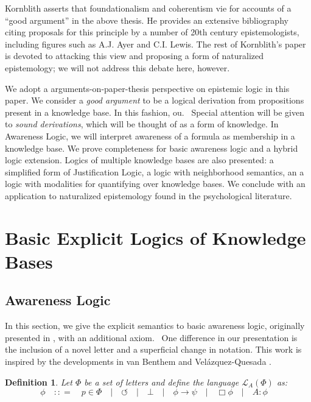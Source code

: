 \documentclass{article}
\newcommand{\tmtextit}[1]{{\itshape{#1}}}
\newtheorem{definition}{Definition}
\begin{document}
Kornblith asserts that foundationalism and coherentism vie for accounts of a
``good argument'' in the above thesis.  He provides an extensive bibliography
citing proposals for this principle by a number of 20th century
epistemologists, including figures such as A.J. Ayer and C.I. Lewis.  The
rest of Kornblith's paper is devoted to attacking this view and proposing a
form of naturalized epistemology; we will not address this debate here,
however.



We adopt a arguments-on-paper-thesis perspective on epistemic logic in this
paper.  We consider a \tmtextit{good argument} to be a logical derivation
from propositions present in a knowledge base.  In this fashion, ou.  \
Special attention will be given to \tmtextit{sound derivations}, which will be
thought of as a form of knowledge.  In Awareness Logic, we will interpret
awareness of a formula as membership in a knowledge base.  We prove
completeness for basic awareness logic and a hybrid logic extension.  Logics
of multiple knowledge bases are also presented: a simplified form of
Justification Logic, a logic with neighborhood semantics, an a logic with
modalities for quantifying over knowledge bases.  We conclude with an
application to naturalized epistemology found in the psychological literature.

\section{Basic Explicit Logics of Knowledge Bases}

\subsection{Awareness Logic\label{awarenesslogic}}

In this section, we give the explicit semantics to basic awareness logic,
originally presented in {\cite{fagin_belief_1987}}, with an additional axiom.
\ One difference in our presentation is the inclusion of a novel letter and a
superficial change in notation.  This work is inspired by the developments in
van Benthem and Vel\'azquez-Quesada {\cite{van_benthem_inference_2009}}.

\begin{definition}
  Let $\Phi$ be a set of letters and define the language $\mathcal{L}_A
  (\Phi)$ as:
  \[ \phi \hspace{1em} : : = \hspace{1em} p \in \Phi \hspace{1em} |
     \hspace{1em} \circlearrowleft \hspace{1em} | \hspace{1em} \bot
     \hspace{1em} | \hspace{1em} \phi \rightarrow \psi \hspace{1em} |
     \hspace{1em} \Box \phi \hspace{1em} | \hspace{1em} A : \phi \hspace{1em}
  \]
\end{definition}
\end{document}
